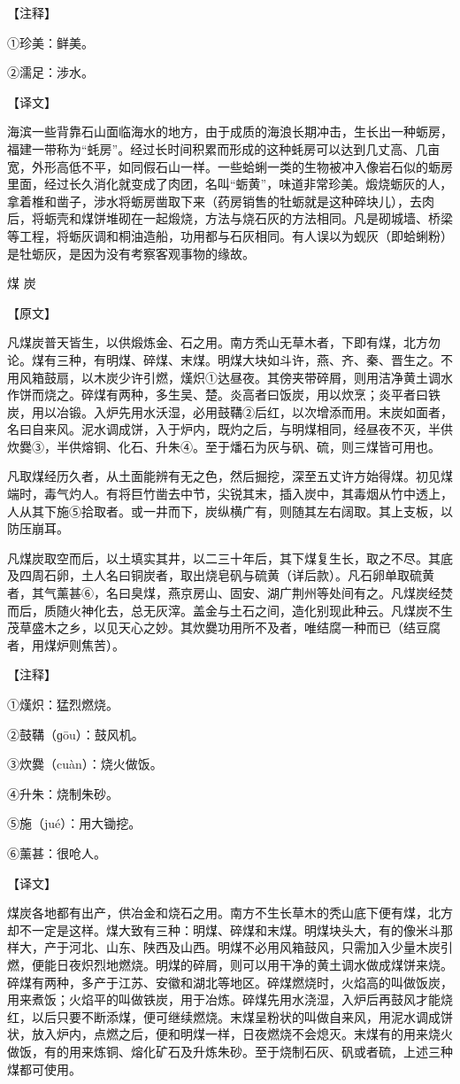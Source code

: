 \documentclass[12pt,UTF8]{ctexbook}
\begin{document}
【注释】

①珍美：鲜美。

②濡足：涉水。

【译文】

海滨一些背靠石山面临海水的地方，由于成质的海浪长期冲击，生长出一种蛎房，福建一带称为“蚝房”。经过长时间积累而形成的这种蚝房可以达到几丈高、几亩宽，外形高低不平，如同假石山一样。一些蛤蜊一类的生物被冲入像岩石似的蛎房里面，经过长久消化就变成了肉团，名叫“蛎黄”，味道非常珍美。煅烧蛎灰的人，拿着椎和凿子，涉水将蛎房凿取下来（药房销售的牡蛎就是这种碎块儿），去肉后，将蛎壳和煤饼堆砌在一起煅烧，方法与烧石灰的方法相同。凡是砌城墙、桥梁等工程，将蛎灰调和桐油造船，功用都与石灰相同。有人误以为蚬灰（即蛤蜊粉）是牡蛎灰，是因为没有考察客观事物的缘故。

煤 炭

【原文】

凡煤炭普天皆生，以供煅炼金、石之用。南方秃山无草木者，下即有煤，北方勿论。煤有三种，有明煤、碎煤、末煤。明煤大块如斗许，燕、齐、秦、晋生之。不用风箱鼓扇，以木炭少许引燃，熯炽①达昼夜。其傍夹带碎屑，则用洁净黄土调水作饼而烧之。碎煤有两种，多生吴、楚。炎高者曰饭炭，用以炊烹；炎平者曰铁炭，用以冶锻。入炉先用水沃湿，必用鼓鞲②后红，以次增添而用。末炭如面者，名曰自来风。泥水调成饼，入于炉内，既灼之后，与明煤相同，经昼夜不灭，半供炊爨③，半供熔铜、化石、升朱④。至于燔石为灰与矾、硫，则三煤皆可用也。

凡取煤经历久者，从土面能辨有无之色，然后掘挖，深至五丈许方始得煤。初见煤端时，毒气灼人。有将巨竹凿去中节，尖锐其末，插入炭中，其毒烟从竹中透上，人从其下施⑤拾取者。或一井而下，炭纵横广有，则随其左右阔取。其上支板，以防压崩耳。

凡煤炭取空而后，以土填实其井，以二三十年后，其下煤复生长，取之不尽。其底及四周石卵，土人名曰铜炭者，取出烧皂矾与硫黄（详后款）。凡石卵单取硫黄者，其气薰甚⑥，名曰臭煤，燕京房山、固安、湖广荆州等处间有之。凡煤炭经焚而后，质随火神化去，总无灰滓。盖金与土石之间，造化别现此种云。凡煤炭不生茂草盛木之乡，以见天心之妙。其炊爨功用所不及者，唯结腐一种而已（结豆腐者，用煤炉则焦苦）。

【注释】

①熯炽：猛烈燃烧。

②鼓鞲（ɡōu）：鼓风机。

③炊爨（cuàn）：烧火做饭。

④升朱：烧制朱砂。

⑤施（jué）：用大锄挖。

⑥薰甚：很呛人。

【译文】

煤炭各地都有出产，供冶金和烧石之用。南方不生长草木的秃山底下便有煤，北方却不一定是这样。煤大致有三种：明煤、碎煤和末煤。明煤块头大，有的像米斗那样大，产于河北、山东、陕西及山西。明煤不必用风箱鼓风，只需加入少量木炭引燃，便能日夜炽烈地燃烧。明煤的碎屑，则可以用干净的黄土调水做成煤饼来烧。碎煤有两种，多产于江苏、安徽和湖北等地区。碎煤燃烧时，火焰高的叫做饭炭，用来煮饭；火焰平的叫做铁炭，用于冶炼。碎煤先用水浇湿，入炉后再鼓风才能烧红，以后只要不断添煤，便可继续燃烧。末煤呈粉状的叫做自来风，用泥水调成饼状，放入炉内，点燃之后，便和明煤一样，日夜燃烧不会熄灭。末煤有的用来烧火做饭，有的用来炼铜、熔化矿石及升炼朱砂。至于烧制石灰、矾或者硫，上述三种煤都可使用。
\end{document}
